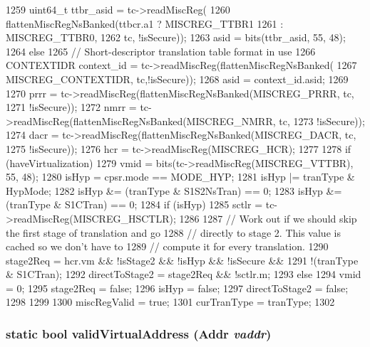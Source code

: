 \begin{DoxyCode}
{{{1259             uint64_t ttbr_asid = tc->readMiscReg(
1260                 flattenMiscRegNsBanked(ttbcr.a1 ? MISCREG_TTBR1
1261                                                 : MISCREG_TTBR0,
1262                                        tc, !isSecure));
1263             asid = bits(ttbr_asid, 55, 48);
1264         } else {
1265             // Short-descriptor translation table format in use
1266             CONTEXTIDR context_id = tc->readMiscReg(flattenMiscRegNsBanked(
1267                 MISCREG_CONTEXTIDR, tc,!isSecure));
1268             asid = context_id.asid;
1269         }
1270         prrr = tc->readMiscReg(flattenMiscRegNsBanked(MISCREG_PRRR, tc,
1271                                !isSecure));
1272         nmrr = tc->readMiscReg(flattenMiscRegNsBanked(MISCREG_NMRR, tc,
1273                                !isSecure));
1274         dacr = tc->readMiscReg(flattenMiscRegNsBanked(MISCREG_DACR, tc,
1275                                !isSecure));
1276         hcr  = tc->readMiscReg(MISCREG_HCR);
1277 
1278         if (haveVirtualization) {
1279             vmid   = bits(tc->readMiscReg(MISCREG_VTTBR), 55, 48);
1280             isHyp  = cpsr.mode == MODE_HYP;
1281             isHyp |=  tranType & HypMode;
1282             isHyp &= (tranType & S1S2NsTran) == 0;
1283             isHyp &= (tranType & S1CTran)    == 0;
1284             if (isHyp) {
1285                 sctlr = tc->readMiscReg(MISCREG_HSCTLR);
1286             }
1287             // Work out if we should skip the first stage of translation and go
1288             // directly to stage 2. This value is cached so we don't have to
1289             // compute it for every translation.
1290             stage2Req      = hcr.vm && !isStage2 && !isHyp && !isSecure &&
1291                              !(tranType & S1CTran);
1292             directToStage2 = stage2Req && !sctlr.m;
1293         } else {
1294             vmid           = 0;
1295             stage2Req      = false;
1296             isHyp          = false;
1297             directToStage2 = false;
1298         }
1299     }
1300     miscRegValid = true;
1301     curTranType  = tranType;
1302 }
\end{DoxyCode}
\hypertarget{classArmISA_1_1TLB_a3e576c3e0d39dfca708baea44ebf0617}{
\subsubsection[{validVirtualAddress}]{\setlength{\rightskip}{0pt plus 5cm}static bool validVirtualAddress ({\bf Addr} {\em vaddr})}}
